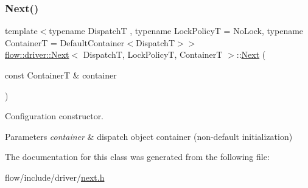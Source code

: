 \subsubsection{\texorpdfstring{Next()}{Next()}}
{\footnotesize\ttfamily template$<$typename DispatchT , typename Lock\+PolicyT  = No\+Lock, typename ContainerT  = Default\+Container$<$\+Dispatch\+T$>$$>$ \\
\hyperlink{classflow_1_1driver_1_1_next}{flow\+::driver\+::\+Next}$<$ DispatchT, Lock\+PolicyT, ContainerT $>$\+::\hyperlink{classflow_1_1driver_1_1_next}{Next} (\begin{DoxyParamCaption}\item[{const ContainerT \&}]{container }\end{DoxyParamCaption})\hspace{0.3cm}{\ttfamily [explicit]}}



Configuration constructor. 


\begin{DoxyParams}{Parameters}
{\em container} & dispatch object container (non-\/default initialization) \\
\hline
\end{DoxyParams}


The documentation for this class was generated from the following file\+:\begin{DoxyCompactItemize}
\item 
flow/include/driver/\hyperlink{next_8h}{next.\+h}\end{DoxyCompactItemize}
